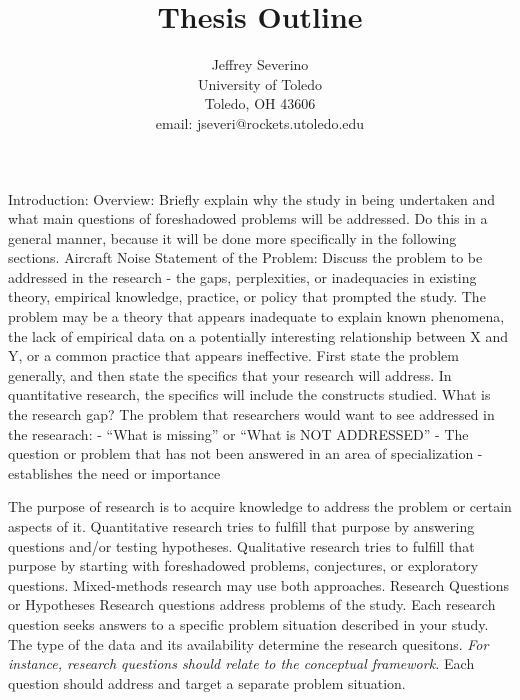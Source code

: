 \documentclass[a4paper]{report}
\begin{document}
\begin{titlepage}
    \title{Thesis Outline}
    \author{ Jeffrey Severino \\
        University of Toledo \\
        Toledo, OH  43606 \\
    email: jseveri@rockets.utoledo.edu}


    \maketitle

\end{titlepage}
\begin{outline}[enumerate]
    \1 Introduction:
    \1[1-A.] Overview: Briefly explain why the study in being undertaken and what 
    main questions of foreshadowed problems will be addressed. Do this in a 
    general manner, because it will be done more specifically in the 
    following sections.
    \2 Aircraft Noise
    \1[1-B.] Statement of the Problem: Discuss the problem to be addressed in the
    research - the gaps, perplexities, or inadequacies in existing theory, 
    empirical knowledge, practice, or policy that prompted the study. The problem may be
    a theory that appears inadequate to explain known phenomena, the lack of 
    empirical data on a potentially interesting relationship between X and Y,
    or a common practice that appears ineffective. First state the problem
    generally, and then state the specifics that your research will address. In 
    quantitative research, the specifics will include the constructs studied.
    What is the research gap?  
    The problem that researchers would want to see addressed in the researach:
    - ``What is missing'' or ``What is NOT ADDRESSED''
    - The question or problem that has not been answered in an area of specialization 
    - establishes the need or importance
    
    \1[1-C.] 
    The purpose of research is to acquire knowledge to address the problem or 
    certain aspects of it. Quantitative research tries to fulfill that purpose 
    by answering questions and/or testing hypotheses. Qualitative research 
    tries to fulfill that purpose by starting with foreshadowed problems,
    conjectures, or exploratory questions. Mixed-methods research may use both 
    approaches.
    \1[1-D.1] Research Questions or Hypotheses 
    Research questions address problems of the study. Each research question 
    seeks answers to a specific problem situation described in your study. 
    The type of the data and its availability determine the research quesitons.
    \textit{ For instance, research questions should relate to the conceptual 
    framework.} Each question should address and target a separate problem situation.


\end{outline}
\end{document}
